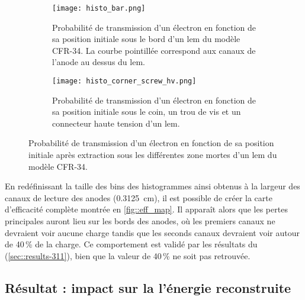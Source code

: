       \begin{figure}[htbp]
        \begin{subfigure}[t]{0.48\textwidth}
          \centering
          \texttt{[image: histo\_bar.png]}
          \caption{Probabilité de transmission d'un électron en fonction de sa position initiale sous le bord d'un \gls{lem} du modèle CFR-34. La courbe pointillée correspond aux canaux de l'anode au dessus du \gls{lem}.}
        \end{subfigure}
        \hfill
        \begin{subfigure}[t]{0.48\textwidth}
          \centering
          \texttt{[image: histo\_corner\_screw\_hv.png]}
          \caption{Probabilité de transmission d'un électron en fonction de sa position initiale sous le coin, un trou de vis et un connecteur haute tension d'un \gls{lem}.}
        \end{subfigure}
        \caption[Probabilité de transmission des zones mortes d'un LEM]{\label{fig::histo_eff}Probabilité de transmission d'un électron en fonction de sa position initiale après extraction sous les différentes zone mortes d'un \gls{lem} du modèle CFR-34.}
      \end{figure}
            
      En redéfinissant la taille des bins des histogrammes ainsi obtenus à la largeur des canaux de lecture des anodes (\SI{0.3125}{\centi\meter}), il est possible de créer la carte d'efficacité complète montrée en \autoref{fig::eff_map}. Il apparaît alors que les pertes principales auront lieu sur les bords des anodes, où les premiers canaux ne devraient voir aucune charge tandis que les seconds canaux devraient voir autour de 40\,\% de la charge. Ce comportement est validé par les résultats du \TOO{} (\autoref{sec::results-311}), bien que la valeur de 40\,\% ne soit pas retrouvée.
            
%            
            
    \subsection{Résultat : impact sur la l'énergie reconstruite}
            
